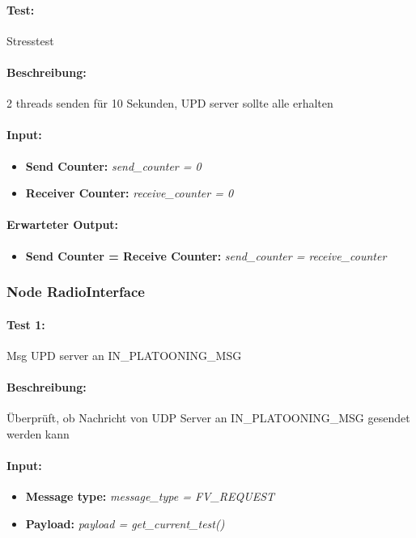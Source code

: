 \documentclass[a4paper, 12pt, titlepage]{scrartcl}
\begin{document}
{			\paragraph{Test:}{Stresstest}
				\paragraph{Beschreibung:} 2 threads senden für 10 Sekunden, UPD server sollte alle erhalten
				\paragraph{Input:}
				\begin{itemize} \itemsep-0.5em
					\item \textbf{Send Counter:} \emph{send\_counter = 0}
					\item \textbf{Receiver Counter:} \emph{receive\_counter = 0}
				\end{itemize}
				\paragraph{Erwarteter Output:}
				\begin{itemize} \itemsep-0.5em
					\item \textbf{Send Counter = Receive Counter:} \emph{send\_counter = receive\_counter}
				\end{itemize}	
				
			\subsubsection{Node RadioInterface}
			\label{node_radio_interface}
			\paragraph{Test 1:} {Msg UPD server an IN\_PLATOONING\_MSG}
			\paragraph{Beschreibung:} Überprüft, ob Nachricht von UDP Server an IN\_PLATOONING\_MSG gesendet werden kann
			\paragraph{Input:}
			\begin{itemize} \itemsep-0.5em
				\item \textbf{Message type:} \emph{message\_type = FV\_REQUEST}
				\item \textbf{Payload:} \emph{payload = get\_current\_test()}
			\end{itemize}
}
\end{document}
